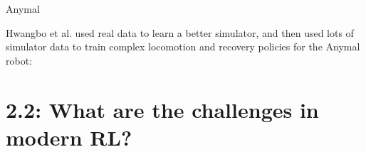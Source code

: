 \documentclass[9pt]{beamer}
\begin{document}
\begin{frame}{Anymal}

Hwangbo et al. used real data to learn a better simulator, and then used lots of simulator data to train complex locomotion and recovery policies for the Anymal robot:

\begin{center}
\end{center}

\end{frame}

\section{2.2: What are the challenges in modern RL?}
\end{document}
